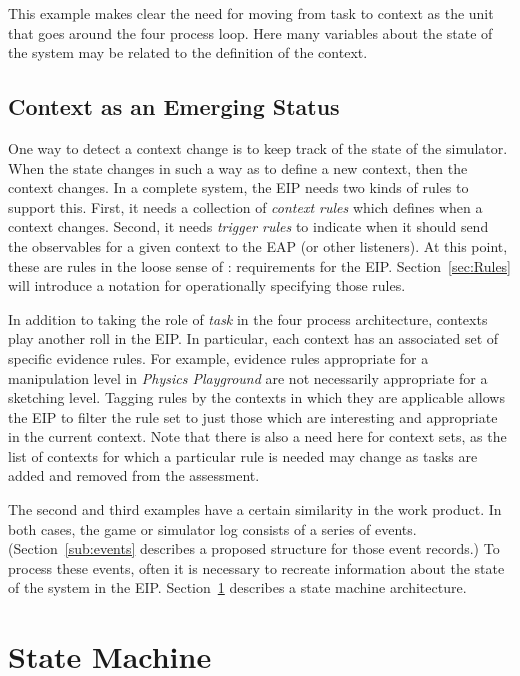 \documentclass{article}
\begin{document}
  This example makes clear the need for moving from task to context as
  the unit that goes around the four process loop.  Here many
  variables about the state of the system may be related to the
  definition of the context.

  \subsection{Context as an Emerging Status}

  One way to detect a context change is to keep track of the state of
  the simulator.  When the state changes in such a way as to define a
  new context, then the context changes.  In a complete system, the
  EIP needs two kinds of rules to support this.  First, it needs a
  collection of \textit{context rules} which defines when a context
  changes.  Second, it needs \textit{trigger rules} to indicate when
  it should send the observables for a given context to the EAP (or
  other listeners).  At this point, these are rules in the loose sense
  of :  requirements for the EIP.
  Section~\ref{sec:Rules} will introduce a notation for operationally
  specifying those rules.

  In addition to taking the role of \textit{task} in the four process
  architecture, contexts play another roll in the EIP.  In particular,
  each context has an associated set of specific evidence rules.  For
  example, evidence rules appropriate for a manipulation level in
  \textit{Physics Playground} are not necessarily appropriate for a
  sketching level.  Tagging rules by the contexts in which they are
  applicable allows the EIP to filter the rule set to just those which
  are interesting and appropriate in the current context.  Note that
  there is also a need here for context sets, as the list of contexts
  for which a particular rule is needed may change as tasks are added
  and removed from the assessment.

  The second and third examples have a certain similarity in the work
  product.  In both cases, the game or simulator log consists of a
  series of events.  (Section~\ref{sub:events} describes a proposed
  structure for those event records.)  To process these events, often
  it is necessary to recreate information about the state of the
  system in the EIP.  Section~\ref{sec:stateMachine} describes a state
  machine architecture.

  \section{State Machine}
  \label{sec:stateMachine}
\end{document}
